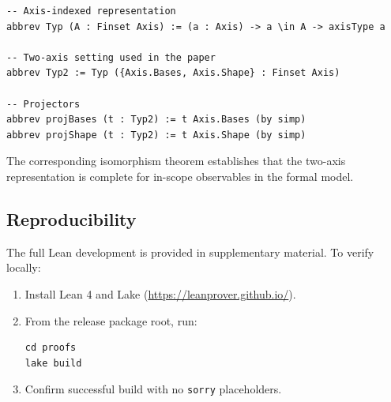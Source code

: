 \begin{lstlisting}[style=lean]
-- Axis-indexed representation
abbrev Typ (A : Finset Axis) := (a : Axis) -> a \in A -> axisType a

-- Two-axis setting used in the paper
abbrev Typ2 := Typ ({Axis.Bases, Axis.Shape} : Finset Axis)

-- Projectors
abbrev projBases (t : Typ2) := t Axis.Bases (by simp)
abbrev projShape (t : Typ2) := t Axis.Shape (by simp)
\end{lstlisting}

The corresponding isomorphism theorem establishes that the two-axis representation is complete for in-scope observables in the formal model.

\subsection{Reproducibility}

The full Lean development is provided in supplementary material. To verify locally:
\begin{enumerate}
\item Install Lean 4 and Lake (\url{https://leanprover.github.io/}).
\item From the release package root, run:
\begin{lstlisting}[style=lean]
cd proofs
lake build
\end{lstlisting}
\item Confirm successful build with no \texttt{sorry} placeholders.
\end{enumerate}
